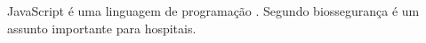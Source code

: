 \documentclass[12pt]{article}   %
\begin{document}
JavaScript é uma linguagem de programação \cite{JavaScriptDefinitivo}. Segundo
 biossegurança é um assunto importante
para hospitais. 


\end{document}
